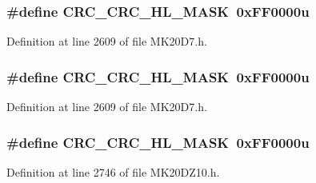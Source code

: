 \subsubsection[{\texorpdfstring{C\+R\+C\+\_\+\+C\+R\+C\+\_\+\+H\+L\+\_\+\+M\+A\+SK}{CRC_CRC_HL_MASK}}]{\setlength{\rightskip}{0pt plus 5cm}\#define C\+R\+C\+\_\+\+C\+R\+C\+\_\+\+H\+L\+\_\+\+M\+A\+SK~0x\+F\+F0000u}\hypertarget{group___c_r_c___register___masks_ga3bda7420d175ce8cfc9acf5726265dad}{}\label{group___c_r_c___register___masks_ga3bda7420d175ce8cfc9acf5726265dad}


Definition at line 2609 of file M\+K20\+D7.\+h.

\subsubsection[{\texorpdfstring{C\+R\+C\+\_\+\+C\+R\+C\+\_\+\+H\+L\+\_\+\+M\+A\+SK}{CRC_CRC_HL_MASK}}]{\setlength{\rightskip}{0pt plus 5cm}\#define C\+R\+C\+\_\+\+C\+R\+C\+\_\+\+H\+L\+\_\+\+M\+A\+SK~0x\+F\+F0000u}\hypertarget{group___c_r_c___register___masks_ga3bda7420d175ce8cfc9acf5726265dad}{}\label{group___c_r_c___register___masks_ga3bda7420d175ce8cfc9acf5726265dad}


Definition at line 2609 of file M\+K20\+D7.\+h.

\subsubsection[{\texorpdfstring{C\+R\+C\+\_\+\+C\+R\+C\+\_\+\+H\+L\+\_\+\+M\+A\+SK}{CRC_CRC_HL_MASK}}]{\setlength{\rightskip}{0pt plus 5cm}\#define C\+R\+C\+\_\+\+C\+R\+C\+\_\+\+H\+L\+\_\+\+M\+A\+SK~0x\+F\+F0000u}\hypertarget{group___c_r_c___register___masks_ga3bda7420d175ce8cfc9acf5726265dad}{}\label{group___c_r_c___register___masks_ga3bda7420d175ce8cfc9acf5726265dad}


Definition at line 2746 of file M\+K20\+D\+Z10.\+h.


